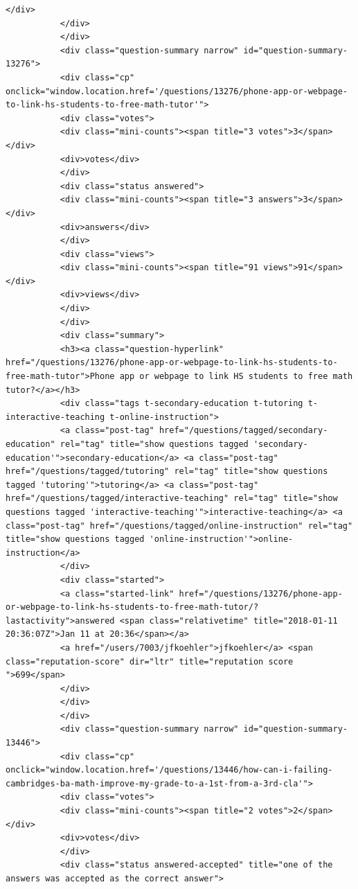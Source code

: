 \documentclass[11pt]{article}
\begin{document}
\begin{Verbatim}[commandchars=\\\{\}]
           </div>
           </div>
           </div>
           <div class="question-summary narrow" id="question-summary-13276">
           <div class="cp" onclick="window.location.href='/questions/13276/phone-app-or-webpage-to-link-hs-students-to-free-math-tutor'">
           <div class="votes">
           <div class="mini-counts"><span title="3 votes">3</span></div>
           <div>votes</div>
           </div>
           <div class="status answered">
           <div class="mini-counts"><span title="3 answers">3</span></div>
           <div>answers</div>
           </div>
           <div class="views">
           <div class="mini-counts"><span title="91 views">91</span></div>
           <div>views</div>
           </div>
           </div>
           <div class="summary">
           <h3><a class="question-hyperlink" href="/questions/13276/phone-app-or-webpage-to-link-hs-students-to-free-math-tutor">Phone app or webpage to link HS students to free math tutor?</a></h3>
           <div class="tags t-secondary-education t-tutoring t-interactive-teaching t-online-instruction">
           <a class="post-tag" href="/questions/tagged/secondary-education" rel="tag" title="show questions tagged 'secondary-education'">secondary-education</a> <a class="post-tag" href="/questions/tagged/tutoring" rel="tag" title="show questions tagged 'tutoring'">tutoring</a> <a class="post-tag" href="/questions/tagged/interactive-teaching" rel="tag" title="show questions tagged 'interactive-teaching'">interactive-teaching</a> <a class="post-tag" href="/questions/tagged/online-instruction" rel="tag" title="show questions tagged 'online-instruction'">online-instruction</a>
           </div>
           <div class="started">
           <a class="started-link" href="/questions/13276/phone-app-or-webpage-to-link-hs-students-to-free-math-tutor/?lastactivity">answered <span class="relativetime" title="2018-01-11 20:36:07Z">Jan 11 at 20:36</span></a>
           <a href="/users/7003/jfkoehler">jfkoehler</a> <span class="reputation-score" dir="ltr" title="reputation score ">699</span>
           </div>
           </div>
           </div>
           <div class="question-summary narrow" id="question-summary-13446">
           <div class="cp" onclick="window.location.href='/questions/13446/how-can-i-failing-cambridges-ba-math-improve-my-grade-to-a-1st-from-a-3rd-cla'">
           <div class="votes">
           <div class="mini-counts"><span title="2 votes">2</span></div>
           <div>votes</div>
           </div>
           <div class="status answered-accepted" title="one of the answers was accepted as the correct answer">

\end{Verbatim}
\end{document}
